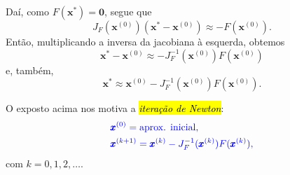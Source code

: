 Daí, como $F(\pmb{x}^*) = \pmb{0}$, segue que
\begin{equation}
  J_F(\pmb{x}^{(0)})(\pmb{x}^*-\pmb{x}^{(0)}) \approx -F(\pmb{x}^{(0)}).
\end{equation}
Então, multiplicando a inversa da jacobiana à esquerda, obtemos
\begin{equation}
  \pmb{x}^*-\pmb{x}^{(0)} \approx - J_F^{-1}(\pmb{x}^{(0)})F(\pmb{x}^{(0)})
\end{equation}
e, também,
\begin{equation}
  \pmb{x}^* \approx \pmb{x}^{(0)} - J_F^{-1}(\pmb{x}^{(0)})F(\pmb{x}^{(0)}).
\end{equation}

O exposto acima nos motiva a \hl{\emph{iteração de Newton}}{\newton}:
\begin{subequations}\hleq
  \begin{align}
    &\pmb{x}^{(0)} = \text{aprox. inicial},\\
    &\pmb{x}^{(k+1)} = \pmb{x}^{(k)} - J_F^{-1}(\pmb{x}^{(k)})F(\pmb{x}^{(k)}),
  \end{align}
\end{subequations}
com $k=0, 1, 2, \ldots$.


